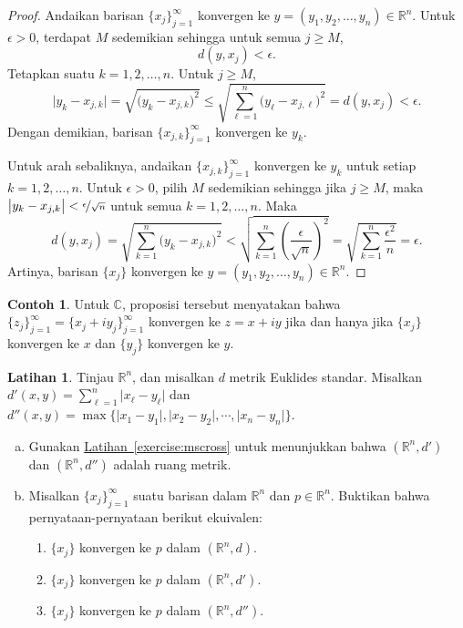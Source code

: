 \documentclass[12pt,openany]{book}
\newcommand{\sabs}[1]{\lvert {#1} \rvert}
\newcommand{\C}{{\mathbb{C}}}
\newcommand{\R}{{\mathbb{R}}}
\theoremstyle{plain}
\theoremstyle{remark}
\theoremstyle{definition}
\newenvironment{exbox}{%
    \def\FrameCommand{\vrule width 1pt \relax\hspace{10pt}}%
    \MakeFramed{\advance\hsize-\width\FrameRestore}%
}{%
    \endMakeFramed
}
\newenvironment{exparts}{%
    \leavevmode\begin{enumerate}[a),noitemsep,topsep=0pt,parsep=0pt,partopsep=0pt]
}{%
    \end{enumerate}
}
\newenvironment{exnumparts}{%
    \leavevmode\begin{enumerate}[1),noitemsep,topsep=0pt,parsep=0pt,partopsep=0pt]
}{%
    \end{enumerate}
}
\theoremstyle{exercise}
\newtheorem{exercise}{Latihan}[section]
\theoremstyle{example}
\newtheorem{example}[thm]{Contoh}
\newcommand{\exerciseref}[1]{\hyperref[#1]{Latihan~\ref*{#1}}}
\begin{document}
\begin{proof}
Andaikan
barisan
$\{ x_j \}_{j=1}^\infty$ konvergen ke
$y = (y_1,y_2,\ldots,y_n) \in \R^n$.
Untuk $\epsilon > 0$, terdapat $M$ sedemikian sehingga untuk semua
$j \geq M$,
\begin{equation*}
d(y,x_j) < \epsilon.
\end{equation*}
Tetapkan suatu $k=1,2,\ldots,n$. Untuk $j \geq M$,
\begin{equation*}
\bigl\lvert y_k - x_{j,k} \bigr\rvert
=
\sqrt{{\bigl(y_k - x_{j,k} \bigr)}^2}
\leq
\sqrt{\sum_{\ell=1}^n {\bigl(y_\ell-x_{j,\ell}\bigr)}^2}
= d(y,x_j) < \epsilon .
\end{equation*}
Dengan demikian, barisan $\{ x_{j,k} \}_{j=1}^\infty$ konvergen ke $y_k$.

Untuk arah sebaliknya, andaikan
$\{ x_{j,k} \}_{j=1}^\infty$ konvergen ke $y_k$ untuk setiap $k=1,2,\ldots,n$.
Untuk $\epsilon > 0$, pilih $M$ sedemikian sehingga jika $j \geq M$, maka
$\bigl\lvert y_k-x_{j,k} \bigr\rvert < \nicefrac{\epsilon}{\sqrt{n}}$ untuk semua
$k=1,2,\ldots,n$. Maka
\begin{equation*}
d(y,x_j)
=
\sqrt{\sum_{k=1}^n {\bigl(y_k-x_{j,k}\bigr)}^2}
<
\sqrt{\sum_{k=1}^n {\left(\frac{\epsilon}{\sqrt{n}}\right)}^2}
=
\sqrt{\sum_{k=1}^n \frac{{\epsilon^2}}{n}}
= \epsilon .
\end{equation*}
Artinya, barisan $\{ x_j \}$ konvergen ke
$y = (y_1,y_2,\ldots,y_n) \in \R^n$.
\end{proof}

\begin{example}
Untuk $\C$, proposisi tersebut menyatakan bahwa
$\{ z_j \}_{j=1}^\infty = \{ x_j + iy_j \}_{j=1}^\infty$ konvergen
ke $z = x+iy$
jika dan hanya jika $\{ x_j \}$ konvergen ke $x$ dan
$\{ y_j \}$ konvergen ke $y$.
\end{example}

\begin{exbox}
\begin{exercise}
Tinjau $\R^n$, dan misalkan $d$ metrik Euklides standar.
Misalkan $d'(x,y) = \sum_{\ell=1}^n \sabs{x_\ell-y_\ell}$
dan $d''(x,y) = \max \bigl\{ \sabs{x_1-y_1},\sabs{x_2-y_2},\cdots,\sabs{x_n-y_n}
\bigr\}$.
\begin{exparts}
\item
Gunakan \exerciseref{exercise:mscross} untuk menunjukkan bahwa
$(\R^n,d')$ dan
$(\R^n,d'')$ adalah ruang metrik.
\item
Misalkan $\{ x_j \}_{j=1}^\infty$ suatu barisan dalam $\R^n$ dan $p \in \R^n$.
Buktikan bahwa pernyataan-pernyataan berikut ekuivalen:
\begin{exnumparts}
\item
$\{ x_j \}$ konvergen ke $p$ dalam $(\R^n,d)$.
\item
$\{ x_j \}$ konvergen ke $p$ dalam $(\R^n,d')$.
\item
$\{ x_j \}$ konvergen ke $p$ dalam $(\R^n,d'')$.
\end{exnumparts}
\end{exparts}
\end{exercise}
\end{exbox}
\end{document}
